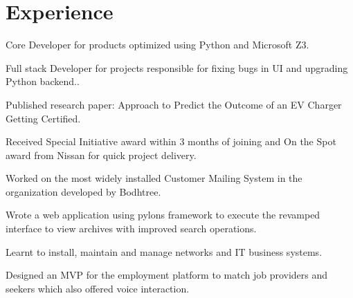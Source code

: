 \documentclass[]{deedy-resume-openfont}
\begin{document}
\hfill
\begin{minipage}[t]{0.66\textwidth} 


\section{Experience}
\vspace{\topsep} %
\begin{tightemize}
\item Core Developer for products optimized using Python and Microsoft Z3.
\item Full stack Developer for projects responsible for fixing bugs in UI and upgrading Python backend.. 
\item Published research paper: Approach to Predict the Outcome of an EV Charger Getting Certified.
\item Received Special Initiative award within 3 months of joining and On the Spot award from Nissan for
quick project delivery.
\end{tightemize}
\sectionsep

\begin{tightemize}
\item Worked on the most widely installed Customer Mailing System in the organization developed by
Bodhtree. 
\item Wrote a web application using pylons framework to execute the revamped interface to view
archives with improved search operations.
\end{tightemize}
\sectionsep

\begin{tightemize}
\item Learnt to install, maintain and manage networks and IT business systems.
\item Designed an MVP for the employment platform to match job providers and seekers which also
offered voice interaction.
\end{tightemize}
\sectionsep


\end{minipage}
\end{document}
